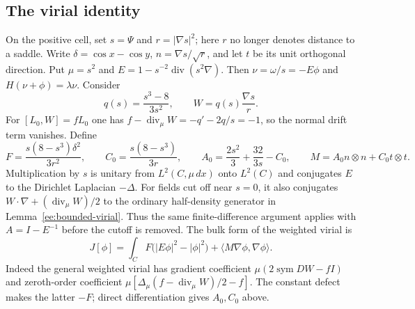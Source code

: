 \documentclass[reqno,11pt]{amsart}
\numberwithin{equation}{section}
\theoremstyle{remark}
\begin{document}
\subsection{The virial identity}
On the positive cell, set $s=\Psi$ and $r=|\nabla s|^2$;
here $r$ no longer denotes distance to a saddle. Write
$\delta=\cos x-\cos y$, $n=\nabla s/\sqrt r$, and let $t$ be its unit
orthogonal direction. Put $\mu=s^2$ and
$E=1-s^{-2}\operatorname{div}(s^2\nabla)$. Then
$\nu=\omega/s=-E\phi$ and $H(\nu+\phi)=\lambda\nu$. Consider
\[
 q(s)=\frac{s^3-8}{3s^2},\qquad W=q(s)\frac{\nabla s}{r}.
\]
For $[L_0,W]=fL_0$ one has
$f-\operatorname{div}_\mu W=-q'-2q/s=-1$, so the normal drift
term vanishes. Define
\[
 F=\frac{s(8-s^3)\delta^2}{3r^2},\qquad
 C_0=\frac{s(8-s^3)}{3r},\qquad
 A_0=\frac{2s^2}{3}+\frac{32}{3s}-C_0,
 \qquad M=A_0n\otimes n+C_0t\otimes t.
\]
Multiplication by $s$ is unitary from $L^2(C,\mu\,dx)$ onto $L^2(C)$ and
conjugates $E$ to the Dirichlet Laplacian $-\Delta$.
For fields cut off near $s=0$, it also conjugates
$W\cdot\nabla+(\operatorname{div}_\mu W)/2$ to the ordinary
half-density generator in Lemma~\ref{ee:bounded-virial}.
Thus the same finite-difference argument applies with
$A=I-E^{-1}$ before the cutoff is removed.
The bulk form of the weighted virial is
\begin{equation}\label{eq:constant-defect-bulk}
 J[\phi]=\int_C F\bigl(|E\phi|^2-|\phi|^2\bigr)
                    +\langle M\nabla\phi,\nabla\phi\rangle.
\end{equation}
Indeed the general weighted virial has gradient coefficient
$\mu(2\operatorname{sym}DW-fI)$ and zeroth-order coefficient
$\mu[\Delta_\mu(f-\operatorname{div}_\mu W)/2-f]$.
The constant defect makes the latter $-F$; direct differentiation gives
$A_0,C_0$ above.
\end{document}
